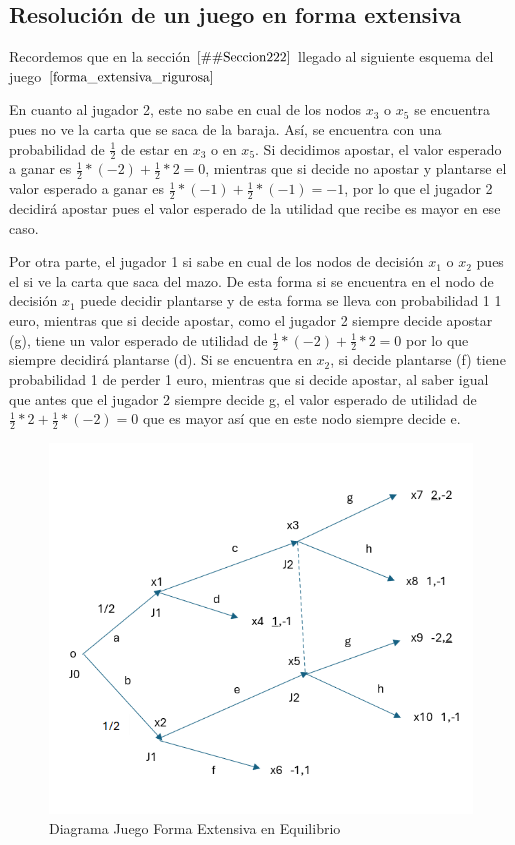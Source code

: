 \documentclass[12pt,a4paper,]{book}
\numberwithin{dummy}{section}
\theoremstyle{ocrenumbox}
\theoremstyle{blacknumex}
\theoremstyle{blacknumbox}
\theoremstyle{ocrenum}
\theoremstyle{ocrenum}
\begin{document}
\hypertarget{Seccion232}{%
\subsection{Resolución de un juego en forma
extensiva}\label{Seccion232}}

Recordemos que en la sección \(\ref{#Seccion222}\) llegado al siguiente
esquema del juego \(\ref{forma_extensiva_rigurosa}\)

En cuanto al jugador 2, este no sabe en cual de los nodos \(x_3\) o
\(x_5\) se encuentra pues no ve la carta que se saca de la baraja. Así,
se encuentra con una probabilidad de \(\frac{1}{2}\) de estar en \(x_3\)
o en \(x_5\). Si decidimos apostar, el valor esperado a ganar es
\(\frac{1}{2}*(-2) +\frac{1}{2}*2 =0\), mientras que si decide no
apostar y plantarse el valor esperado a ganar es
\(\frac{1}{2}*(-1) +\frac{1}{2}*(-1) =-1\), por lo que el jugador 2
decidirá apostar pues el valor esperado de la utilidad que recibe es
mayor en ese caso.

Por otra parte, el jugador 1 si sabe en cual de los nodos de decisión
\(x_1\) o \(x_2\) pues el si ve la carta que saca del mazo. De esta
forma si se encuentra en el nodo de decisión \(x_1\) puede decidir
plantarse y de esta forma se lleva con probabilidad 1 1 euro, mientras
que si decide apostar, como el jugador 2 siempre decide apostar (g),
tiene un valor esperado de utilidad de
\(\frac{1}{2}*(-2) +\frac{1}{2}*2 =0\) por lo que siempre decidirá
plantarse (d). Si se encuentra en \(x_2\), si decide plantarse (f) tiene
probabilidad 1 de perder 1 euro, mientras que si decide apostar, al
saber igual que antes que el jugador 2 siempre decide g, el valor
esperado de utilidad de \(\frac{1}{2}*2 +\frac{1}{2}*(-2) =0\) que es
mayor así que en este nodo siempre decide e.

\begin{figure}[H]

{\centering \includegraphics[width=0.8\linewidth]{forma_extensiva_equilibrio} 

}

\caption{\label{forma_extensiva_equilibrio}Diagrama Juego Forma Extensiva en Equilibrio}\label{fig:forma_extensiva_equilibrio}
\end{figure}
\end{document}
